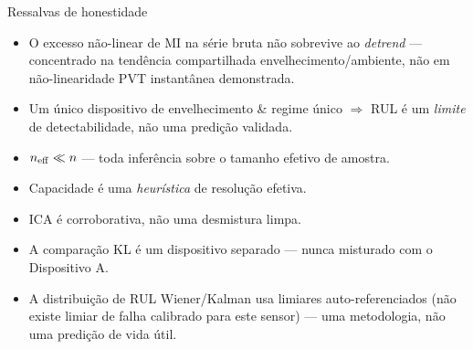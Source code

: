 \documentclass[aspectratio=169,11pt]{beamer}
\begin{document}
\guidequestion{}%
\begin{frame}{Ressalvas de honestidade}
  \begin{TFhonest}%
  \footnotesize
  \begin{itemize}
    \item O excesso não-linear de MI na série bruta \alert{não sobrevive ao
          \emph{detrend}} --- concentrado na tendência compartilhada
          envelhecimento/ambiente, não em não-linearidade PVT instantânea
          demonstrada.
    \item Um único dispositivo de envelhecimento \& regime único
          $\Rightarrow$ RUL é um \emph{limite} de detectabilidade, não uma predição validada.
    \item $n_{\mathrm{eff}} \ll n$ --- toda inferência sobre o tamanho efetivo de amostra.
    \item Capacidade é uma \emph{heurística} de resolução efetiva.
    \item ICA é corroborativa, não uma desmistura limpa.
    \item A comparação KL é um \alert{dispositivo separado} --- nunca misturado com o Dispositivo A.
    \item A distribuição de RUL Wiener/Kalman usa limiares
          auto-referenciados (não existe limiar de falha calibrado para
          este sensor) --- uma metodologia, não uma predição de vida útil.
  \end{itemize}
  \end{TFhonest}
\end{frame}
\end{document}
